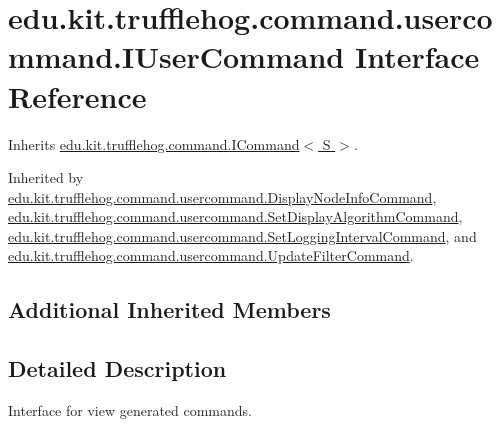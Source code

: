 \hypertarget{interfaceedu_1_1kit_1_1trufflehog_1_1command_1_1usercommand_1_1_i_user_command}{}\section{edu.\+kit.\+trufflehog.\+command.\+usercommand.\+I\+User\+Command Interface Reference}
\label{interfaceedu_1_1kit_1_1trufflehog_1_1command_1_1usercommand_1_1_i_user_command}


Inherits \hyperlink{interfaceedu_1_1kit_1_1trufflehog_1_1command_1_1_i_command}{edu.\+kit.\+trufflehog.\+command.\+I\+Command$<$ S $>$}.



Inherited by \hyperlink{classedu_1_1kit_1_1trufflehog_1_1command_1_1usercommand_1_1_display_node_info_command}{edu.\+kit.\+trufflehog.\+command.\+usercommand.\+Display\+Node\+Info\+Command}, \hyperlink{classedu_1_1kit_1_1trufflehog_1_1command_1_1usercommand_1_1_set_display_algorithm_command}{edu.\+kit.\+trufflehog.\+command.\+usercommand.\+Set\+Display\+Algorithm\+Command}, \hyperlink{classedu_1_1kit_1_1trufflehog_1_1command_1_1usercommand_1_1_set_logging_interval_command}{edu.\+kit.\+trufflehog.\+command.\+usercommand.\+Set\+Logging\+Interval\+Command}, and \hyperlink{classedu_1_1kit_1_1trufflehog_1_1command_1_1usercommand_1_1_update_filter_command}{edu.\+kit.\+trufflehog.\+command.\+usercommand.\+Update\+Filter\+Command}.

\subsection*{Additional Inherited Members}


\subsection{Detailed Description}
Interface for view generated commands. 